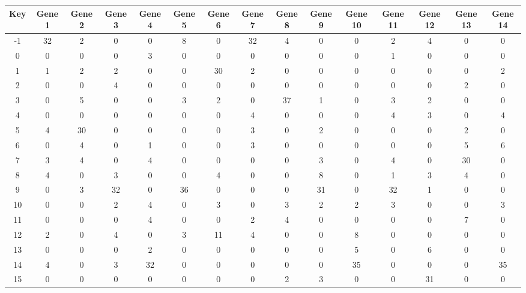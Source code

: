 \begin{tabular}{|c|c|c|c|c|c|c|c|c|c|c|c|c|c|c|}
\hline
Key & Gene 1 & Gene 2 & Gene 3 & Gene 4 & Gene 5 & Gene 6 & Gene 7 & Gene 8 & Gene 9 & Gene 10 & Gene 11 & Gene 12 & Gene 13 & Gene 14 \\
\hline
-1 & 32 & 2 & 0 & 0 & 8 & 0 & 32 & 4 & 0 & 0 & 2 & 4 & 0 & 0 \\
0 & 0 & 0 & 0 & 3 & 0 & 0 & 0 & 0 & 0 & 0 & 1 & 0 & 0 & 0 \\
1 & 1 & 2 & 2 & 0 & 0 & 30 & 2 & 0 & 0 & 0 & 0 & 0 & 0 & 2 \\
2 & 0 & 0 & 4 & 0 & 0 & 0 & 0 & 0 & 0 & 0 & 0 & 0 & 2 & 0 \\
3 & 0 & 5 & 0 & 0 & 3 & 2 & 0 & 37 & 1 & 0 & 3 & 2 & 0 & 0 \\
4 & 0 & 0 & 0 & 0 & 0 & 0 & 4 & 0 & 0 & 0 & 4 & 3 & 0 & 4 \\
5 & 4 & 30 & 0 & 0 & 0 & 0 & 3 & 0 & 2 & 0 & 0 & 0 & 2 & 0 \\
6 & 0 & 4 & 0 & 1 & 0 & 0 & 3 & 0 & 0 & 0 & 0 & 0 & 5 & 6 \\
7 & 3 & 4 & 0 & 4 & 0 & 0 & 0 & 0 & 3 & 0 & 4 & 0 & 30 & 0 \\
8 & 4 & 0 & 3 & 0 & 0 & 4 & 0 & 0 & 8 & 0 & 1 & 3 & 4 & 0 \\
9 & 0 & 3 & 32 & 0 & 36 & 0 & 0 & 0 & 31 & 0 & 32 & 1 & 0 & 0 \\
10 & 0 & 0 & 2 & 4 & 0 & 3 & 0 & 3 & 2 & 2 & 3 & 0 & 0 & 3 \\
11 & 0 & 0 & 0 & 4 & 0 & 0 & 2 & 4 & 0 & 0 & 0 & 0 & 7 & 0 \\
12 & 2 & 0 & 4 & 0 & 3 & 11 & 4 & 0 & 0 & 8 & 0 & 0 & 0 & 0 \\
13 & 0 & 0 & 0 & 2 & 0 & 0 & 0 & 0 & 0 & 5 & 0 & 6 & 0 & 0 \\
14 & 4 & 0 & 3 & 32 & 0 & 0 & 0 & 0 & 0 & 35 & 0 & 0 & 0 & 35 \\
15 & 0 & 0 & 0 & 0 & 0 & 0 & 0 & 2 & 3 & 0 & 0 & 31 & 0 & 0 \\
\hline
\end{tabular}